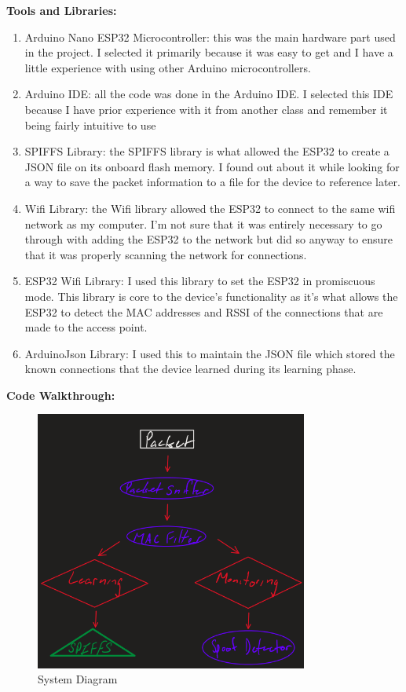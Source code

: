 \documentclass[letterpaper, 11pt]{article}
\newcommand{\secHeader}[1]{\vspace{2mm} \noindent \textbf{#1:}\vspace{-4mm}}
\begin{document}
\secHeader{Tools and Libraries}
\vspace{5mm}
\begin{enumerate}
    \item Arduino Nano ESP32 Microcontroller: this was the main hardware part used in the project. I selected it primarily because it was easy to get and I have a little experience with using other 
    Arduino microcontrollers.
    \item Arduino IDE: all the code was done in the Arduino IDE. I selected this IDE because I have prior experience with it from another class and remember it being fairly intuitive to use
    \item SPIFFS Library: the SPIFFS library is what allowed the ESP32 to create a JSON file on its onboard flash memory. I found out about it while looking for a way to save the packet information
    to a file for the device to reference later.
    \item Wifi Library: the Wifi library allowed the ESP32 to connect to the same wifi network as my computer. I'm not sure that it was entirely necessary to go through with adding the ESP32 to the 
    network but did so anyway to ensure that it was properly scanning the network for connections.
    \item ESP32 Wifi Library: I used this library to set the ESP32 in promiscuous mode. This library is core to the device's functionality as it's what allows the ESP32 to detect the 
    MAC addresses and RSSI of the connections that are made to the access point.
    \item ArduinoJson Library: I used this to maintain the JSON file which stored the known connections that the device learned during its learning phase.
\end{enumerate}


\newpage
\secHeader{Code Walkthrough}
\vspace{5mm}

\begin{figure}[H] %
    \centering
    \includegraphics[width=0.8\textwidth]{Diagram.png}
    \caption{System Diagram}
    \label{fig:SystemDiagram}
\end{figure}
\end{document}
